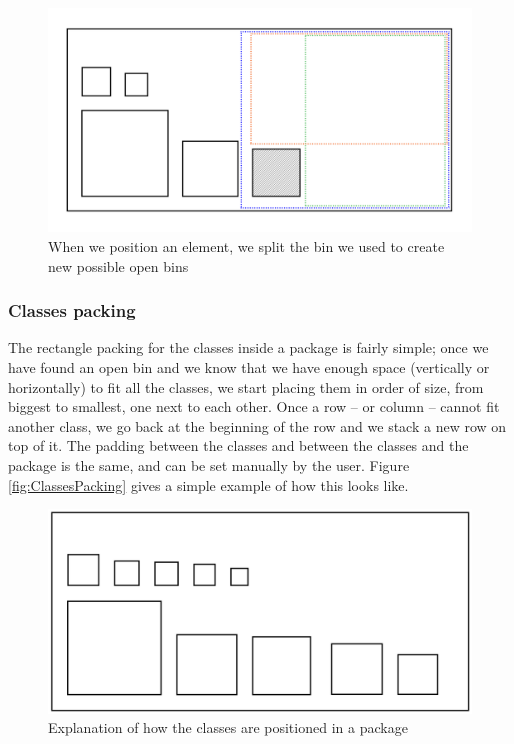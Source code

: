 \documentclass[]{usiinfbachelorproject}
\begin{document}
\begin{figure} [H]
\centering
\includegraphics[width=.7\textwidth]{pictures/binsPlacing.png}
\caption{When we position an element, we split the bin we used to create new possible open bins}
\label{fig:binsPlacing}
\end{figure}

\subsubsection{Classes packing} \label{Classes packing}
The rectangle packing for the classes inside a package is fairly simple; once we have found an open bin and we know that we have enough space (vertically or horizontally) to fit all the classes, we start placing them in order of size, from biggest to smallest, one next to each other. Once a row -- or column -- cannot fit another class, we go back at the beginning of the row and we stack a new row on top of it. The padding between the classes and between the classes and the package is the same, and can be set manually by the user.
Figure \ref{fig:ClassesPacking} gives a simple example of how this looks like.

\begin{figure} [H]
\centering
\includegraphics[width=.7\textwidth]{pictures/classPacking.png}
\caption{Explanation of how the classes are positioned in a package}
\label{fig:classesPacking}
\end{figure}
\end{document}
